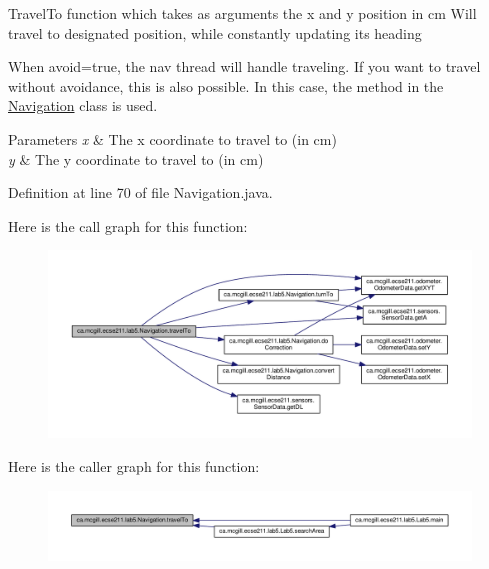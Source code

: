 Travel\+To function which takes as arguments the x and y position in cm Will travel to designated position, while constantly updating it\textquotesingle{}s heading

When avoid=true, the nav thread will handle traveling. If you want to travel without avoidance, this is also possible. In this case, the method in the \hyperlink{classca_1_1mcgill_1_1ecse211_1_1lab5_1_1_navigation}{Navigation} class is used.


\begin{DoxyParams}{Parameters}
{\em x} & The x coordinate to travel to (in cm) \\
\hline
{\em y} & The y coordinate to travel to (in cm) \\
\hline
\end{DoxyParams}


Definition at line 70 of file Navigation.\+java.

Here is the call graph for this function\+:
\nopagebreak
\begin{figure}[H]
\begin{center}
\leavevmode
\includegraphics[width=350pt]{classca_1_1mcgill_1_1ecse211_1_1lab5_1_1_navigation_a318969f4776d0bf4a8721be3d2444a5c_cgraph}
\end{center}
\end{figure}
Here is the caller graph for this function\+:
\nopagebreak
\begin{figure}[H]
\begin{center}
\leavevmode
\includegraphics[width=350pt]{classca_1_1mcgill_1_1ecse211_1_1lab5_1_1_navigation_a318969f4776d0bf4a8721be3d2444a5c_icgraph}
\end{center}
\end{figure}
\mbox{\label{classca_1_1mcgill_1_1ecse211_1_1lab5_1_1_navigation_ac2c358ea3663ac06fcf757628a4a4a31}} 
